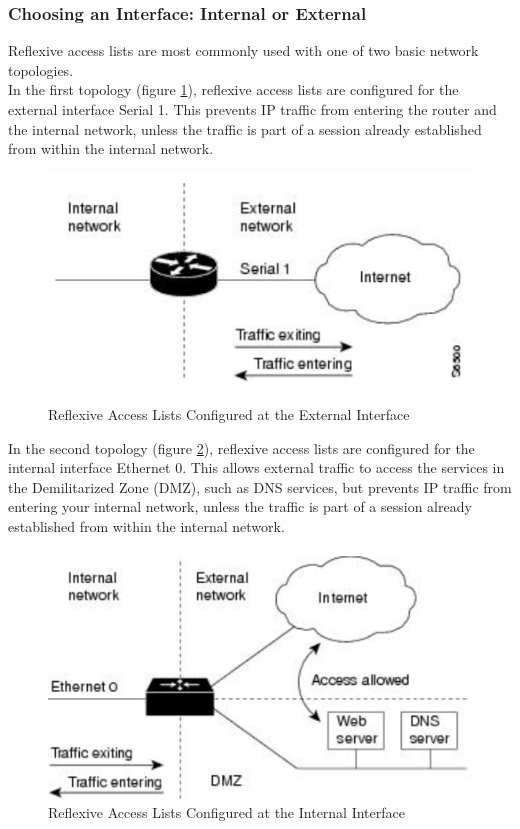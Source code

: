 \subsubsection{Choosing an Interface: Internal or External} 
Reflexive access lists are most commonly used with one of two basic network topologies. \\

In the first topology (figure \ref{ReflexiveACLex}), reflexive access lists are configured for the external interface Serial 1. This prevents IP traffic from entering the router and the internal network, unless the traffic is part of a session already established from within the internal network.\\

\begin{figure}[hbtp]
\caption{Reflexive Access Lists Configured at the External Interface}\label{ReflexiveACLex}
\centering
\includegraphics[scale=0.5]{pictures/ReflexiveACLex.PNG}
\end{figure}

In the second topology (figure \ref{ReflexiveACLin}), reflexive access lists are configured for the internal interface Ethernet 0. This allows external traffic to access the services in the Demilitarized Zone (DMZ), such as DNS services, but prevents IP traffic from entering your internal network, unless the traffic is part of a session already established from within the internal network.

\begin{figure}[hbtp]
\caption{Reflexive Access Lists Configured at the Internal Interface}\label{ReflexiveACLin}
\centering
\includegraphics[scale=0.5]{pictures/ReflexiveACLin.PNG}
\end{figure}

